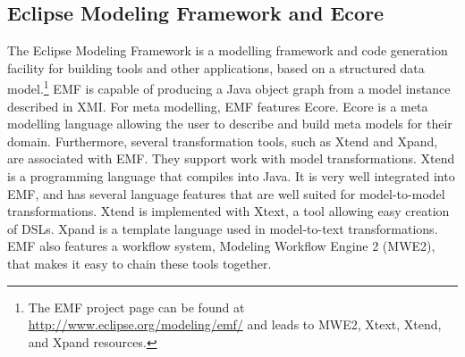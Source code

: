 \subsection{Eclipse Modeling Framework and Ecore}
The Eclipse Modeling Framework is a modelling framework and code generation facility for building tools and other applications, based on a structured data model.\footnote{The EMF project page can be found at \url{http://www.eclipse.org/modeling/emf/} and leads to MWE2, Xtext, Xtend, and Xpand resources.} EMF is capable of producing a Java object graph from a model instance described in XMI. For meta modelling, EMF features Ecore. Ecore is a meta modelling language allowing the user to describe and build meta models for their domain. Furthermore, several transformation tools, such as Xtend and Xpand, are associated with EMF. They support work with model transformations. Xtend is a programming language that compiles into Java. It is very well integrated into EMF, and has several language features that are well suited for model-to-model transformations. Xtend is implemented with Xtext, a tool allowing easy creation of DSLs. Xpand is a template language used in model-to-text transformations. EMF also features a workflow system, Modeling Workflow Engine 2 (MWE2), that makes it easy to chain these tools together.
